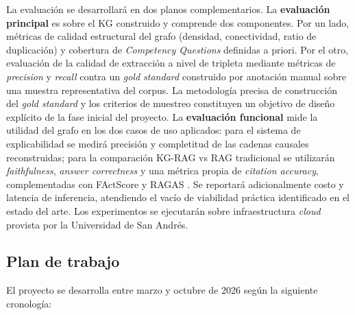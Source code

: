 \documentclass[12pt,a4paper]{article}
\begin{document}
La evaluación se desarrollará en dos planos complementarios. La \textbf{evaluación principal} es sobre el KG construido y comprende dos componentes. Por un lado, métricas de calidad estructural del grafo (densidad, conectividad, ratio de duplicación) y cobertura de \textit{Competency Questions} definidas a priori. Por el otro, evaluación de la calidad de extracción a nivel de tripleta mediante métricas de \textit{precision} y \textit{recall} contra un \textit{gold standard} construido por anotación manual sobre una muestra representativa del corpus. La metodología precisa de construcción del \textit{gold standard} y los criterios de muestreo constituyen un objetivo de diseño explícito de la fase inicial del proyecto. La \textbf{evaluación funcional} mide la utilidad del grafo en los dos casos de uso aplicados: para el sistema de explicabilidad se medirá precisión y completitud de las cadenas causales reconstruidas; para la comparación KG-RAG vs RAG tradicional se utilizarán \textit{faithfulness}, \textit{answer correctness} y una métrica propia de \textit{citation accuracy}, complementadas con FActScore \cite{min2023factscore} y RAGAS \cite{es2024ragas}. Se reportará adicionalmente costo y latencia de inferencia, atendiendo el vacío de viabilidad práctica identificado en el estado del arte. Los experimentos se ejecutarán sobre infraestructura \textit{cloud} provista por la Universidad de San Andrés.

\subsection{Plan de trabajo}

El proyecto se desarrolla entre marzo y octubre de 2026 según la siguiente cronología:
\end{document}

